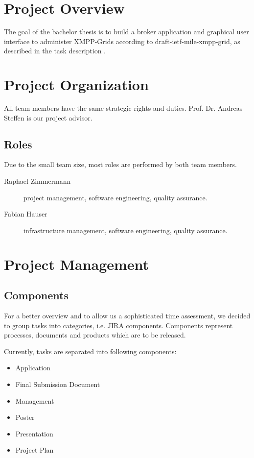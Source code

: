 \tableofcontents %


\mainmatter
\chapter{Project Overview}
The goal of the bachelor thesis is to build a broker application and graphical user interface to administer XMPP-Grids according to draft-ietf-mile-xmpp-grid, as described in the task description \cite{taskdescription}.


\chapter{Project Organization}

All team members have the same strategic rights and duties. Prof. Dr. Andreas Steffen is our project advisor.

\section{Roles}

Due to the small team size, most roles are performed by both team members.

\begin{description}
    \item[Raphael Zimmermann] project management, software engineering, quality assurance.
    \item[Fabian Hauser] infrastructure management, software engineering, quality assurance.
\end{description}

\chapter{Project Management}
\section{Components}

For a better overview and to allow us a sophisticated time assessment, we decided to group tasks into categories, i.e. JIRA components. Components represent processes, documents and products which are to be released.

Currently, tasks are separated into following components:

\begin{multicols}{2}
    \begin{itemize}
        \item Application
        \item Final Submission Document
        \item Management
        \item Poster
        \item Presentation
        \item Project Plan
    \end{itemize}
\end{multicols}

